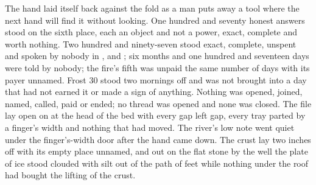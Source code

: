 The hand laid itself back against the fold as a man puts away a tool where the next hand will find it without looking. One hundred and seventy honest answers stood on the sixth place, each an object and not a power, exact, complete and worth nothing. Two hundred and ninety-seven stood exact, complete, unspent and spoken by nobody in ,  and ; six months and one hundred and seventeen days were told by nobody; the fire's fifth was unpaid the same number of days with its payer unnamed. Frost 30 stood two mornings off and was not brought into a day that had not earned it or made a sign of anything. Nothing was opened, joined, named, called, paid or ended; no thread was opened and none was closed. The file lay open on  at the head of the bed with every gap left gap, every tray parted by a finger's width and nothing that had moved. The river's low note went quiet under the finger's-width door after the hand came down. The crust lay two inches off with its empty place unnamed, and out on the flat stone by the well the plate of ice stood clouded with silt out of the path of feet while nothing under the roof had bought the lifting of the crust.
